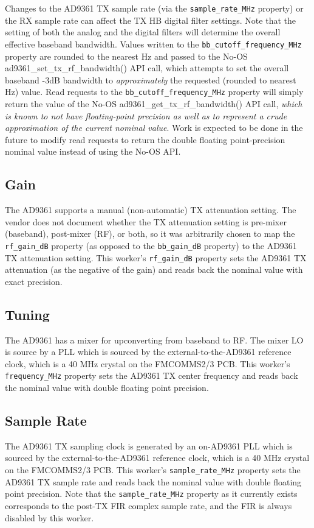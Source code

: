Changes to the AD9361 TX sample rate (via the \verb+sample_rate_MHz+ property) or the RX sample rate can affect the TX HB digital filter settings. Note that the setting of both the analog and the digital filters will determine the overall effective baseband bandwidth. Values written to the \verb+bb_cutoff_frequency_MHz+ property are rounded to the nearest Hz and passed to the No-OS ad9361\_set\_tx\_rf\_bandwidth() API call, which attempts to set the overall baseband -3dB bandwidth to \textit{approximately} the requested (rounded to nearest Hz) value. Read requests to the \verb+bb_cutoff_frequency_MHz+ property will simply return the value of the No-OS ad9361\_get\_tx\_rf\_bandwidth() API call, \textit{which is known to not have floating-point precision as well as to represent a crude approximation of the current nominal value}. Work is expected to be done in the future to modify read requests to return the double floating point-precision nominal value instead of using the No-OS API.
\subsection*{Gain}
The AD9361 supports a manual (non-automatic) TX attenuation setting. The vendor does not document whether the TX attenuation setting is pre-mixer (baseband), post-mixer (RF), or both, so it was arbitrarily chosen to map the \verb+rf_gain_dB+ property (as opposed to the \verb+bb_gain_dB+ property) to the AD9361 TX attenuation setting. This worker's \verb+rf_gain_dB+ property sets the AD9361 TX attenuation (as the negative of the gain) and reads back the nominal value with exact precision.
\subsection*{Tuning}
The AD9361 has a mixer for upconverting from baseband to RF. The mixer LO is source by a PLL which is sourced by the external-to-the-AD9361 reference clock, which is a 40 MHz crystal on the FMCOMMS2/3 PCB. This worker's \verb+frequency_MHz+ property sets the AD9361 TX center frequency and reads back the nominal value with double floating point precision.

\subsection*{Sample Rate}
The AD9361 TX sampling clock is generated by an on-AD9361 PLL which is sourced by the external-to-the-AD9361 reference clock, which is a 40 MHz crystal on the FMCOMMS2/3 PCB. This worker's \verb+sample_rate_MHz+ property sets the AD9361 TX sample rate and reads back the nominal value with double floating point precision. Note that the \verb+sample_rate_MHz+ property as it currently exists corresponds to the post-TX FIR complex sample rate, and the FIR is always disabled by this worker.

